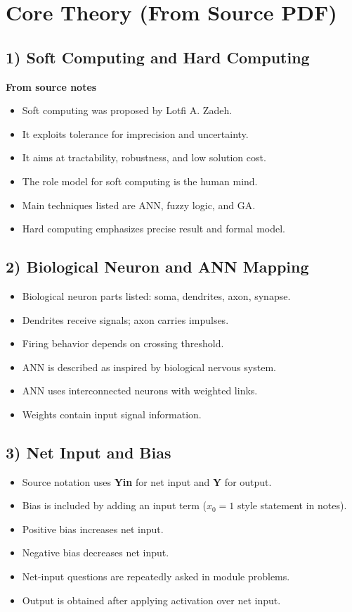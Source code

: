 \documentclass[11pt,a4paper]{article}
\begin{document}
\section*{Core Theory (From Source PDF)}

\subsection*{1) Soft Computing and Hard Computing}
\textbf{From source notes}
\begin{itemize}
\item Soft computing was proposed by Lotfi A. Zadeh.
\item It exploits tolerance for imprecision and uncertainty.
\item It aims at tractability, robustness, and low solution cost.
\item The role model for soft computing is the human mind.
\item Main techniques listed are ANN, fuzzy logic, and GA.
\item Hard computing emphasizes precise result and formal model.
\end{itemize}

\subsection*{2) Biological Neuron and ANN Mapping}
\begin{itemize}
\item Biological neuron parts listed: soma, dendrites, axon, synapse.
\item Dendrites receive signals; axon carries impulses.
\item Firing behavior depends on crossing threshold.
\item ANN is described as inspired by biological nervous system.
\item ANN uses interconnected neurons with weighted links.
\item Weights contain input signal information.
\end{itemize}

\subsection*{3) Net Input and Bias}
\begin{itemize}
\item Source notation uses \textbf{Yin} for net input and \textbf{Y} for output.
\item Bias is included by adding an input term ($x_0=1$ style statement in notes).
\item Positive bias increases net input.
\item Negative bias decreases net input.
\item Net-input questions are repeatedly asked in module problems.
\item Output is obtained after applying activation over net input.
\end{itemize}
\end{document}
